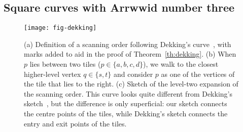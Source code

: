 \documentclass[11pt,a4paper]{article}
\begin{document}
\subsection{Square curves with Arrwwid number three}
\label{sec:squarewithA3}

\begin{figure}
\centering
\texttt{[image: fig-dekking]}
\caption{(a) Definition of a scanning order following Dekking's curve~\cite{Dekking1982}, with marks added to aid in the proof of Theorem~\ref{th:dekking}. (b) When $p$ lies between two tiles ($p \in \{a,b,c,d\}$), we walk to the closest higher-level vertex $q \in \{s,t\}$ and consider $p$ as one of the vertices of the tile that lies to the right. (c) Sketch of the level-two expansion of the scanning order. This curve looks quite different from Dekking's sketch~\cite{Dekking1982}, but the difference is only superficial: our sketch connects the centre points of the tiles, while Dekking's sketch connects the entry and exit points of the tiles.}
\label{fig:dekking}
\end{figure}
\end{document}
